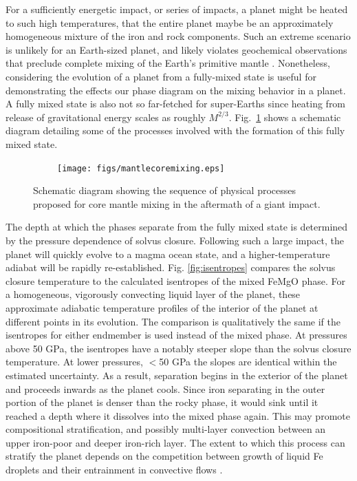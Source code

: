 For a sufficiently energetic impact, or series of impacts, a planet might be heated to
such high temperatures, that the entire planet maybe be an approximately homogeneous
mixture of the iron and rock components. Such an extreme scenario is unlikely for an
Earth-sized planet, and likely violates geochemical observations that preclude complete
mixing of the Earth's primitive mantle \citep{Mukhopadhyay2012}. Nonetheless, considering the
evolution of a planet from a fully-mixed state is useful for demonstrating the effects
our phase diagram on the mixing behavior in a planet. A fully mixed state is also not so
far-fetched for super-Earths since heating from release of gravitational energy scales as
roughly $M^{2/3}$. %
Fig.~\ref{fig:mantlecoremixing} shows a schematic diagram detailing some of the
processes involved with the formation of this fully mixed state.

\begin{figure}[h!]  
  \centering
    \texttt{[image: figs/mantlecoremixing.eps]}  
\caption{ Schematic diagram showing the sequence of physical processes proposed
for core mantle mixing in the aftermath of a giant impact.}
\label{fig:mantlecoremixing}
\end{figure}

The depth at which the phases separate from the fully mixed state is determined by the
pressure dependence of solvus closure. Following such a large impact, the planet will
quickly evolve to a magma ocean state, and a higher-temperature adiabat will be rapidly
re-established. Fig. \ref{fig:isentropes} compares the solvus closure temperature to the
calculated isentropes of the mixed FeMgO phase. For a homogeneous, vigorously convecting
liquid layer of the planet, these approximate adiabatic temperature profiles of the
interior of the planet at different points in its evolution.  The comparison is
qualitatively the same if the isentropes for either endmember is used instead of the
mixed phase. At pressures above 50 GPa, the isentropes have a notably steeper slope than
the solvus closure temperature. At lower pressures, $<$50 GPa the slopes are identical within the
estimated uncertainty. As a result, separation begins in the exterior of the planet and
proceeds inwards as the planet cools. Since iron separating in the outer portion of the
planet is denser than the rocky phase, it would sink until it reached a depth where it
dissolves into the mixed phase again. This may promote compositional stratification, and
possibly multi-layer convection between an upper iron-poor and deeper iron-rich layer.
The extent to which this process can stratify the planet depends on the competition
between growth of liquid Fe droplets and their entrainment in convective flows
\citep{Solomatov2007}.

